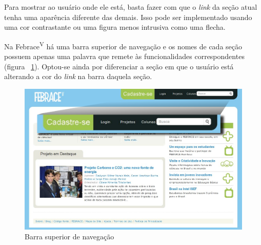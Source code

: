Para mostrar ao usuário onde ele está, basta fazer com que o \textit{link} da seção atual tenha uma aparência diferente das demais. Isso pode ser implementado usando uma cor contrastante ou uma figura menos intrusiva como uma flecha.

Na Febrace\textsuperscript{V} há uma barra superior de navegação e os nomes de cada seção possuem apenas uma palavra que remete às funcionalidades correspondentes (figura ~\ref{home}). Optou-se ainda por diferenciar a seção em que o usuário está alterando a cor do \textit{link} na barra daquela seção. 

    \begin{figure}[h]
        \begin{center}
    \includegraphics[width=1.0\linewidth]{arquivos/superior_bar.png}
        \end{center}
        \caption{Barra superior de navegação}
        \label{home}
    \end{figure}

